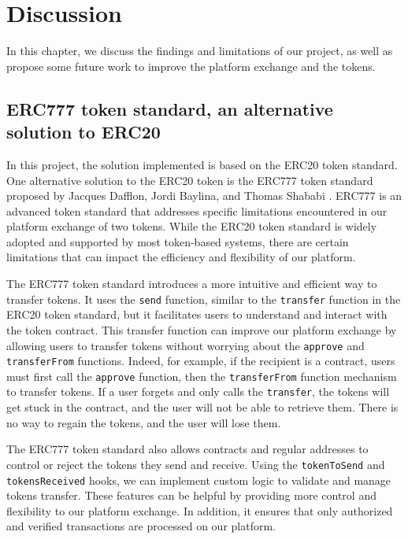 \chapter{Discussion}
\label{ch:futurework}


In this chapter, we discuss the findings and limitations of our project, as well as propose some future work to improve
the platform exchange and the tokens.


\section{ERC777 token standard, an alternative solution to ERC20}


In this project, the solution implemented is based on the ERC20 token standard. One alternative solution to the ERC20 token
is the ERC777 token standard proposed by Jacques Dafflon, Jordi Baylina, and Thomas Shababi \cite{erc777}. ERC777 is an advanced
token standard that addresses specific limitations encountered in our platform exchange of two tokens. While the ERC20
token standard is widely adopted and supported by most token-based systems, there are certain limitations that can
impact the efficiency and flexibility of our platform.


The ERC777 token standard introduces a more intuitive and efficient way to transfer tokens. It uses the
\texttt{send} function, similar to the \texttt{transfer} function in the ERC20 token standard, but it facilitates
users to understand and interact with the token contract. This transfer function can improve our platform exchange by
allowing users to transfer tokens without worrying about the \texttt{approve} and \texttt{transferFrom} functions.
Indeed, for example, if the recipient is a contract, users must first call the \texttt{approve} function, then the
\texttt{transferFrom} function mechanism to transfer tokens. If a user forgets and only calls the \texttt{transfer}, the
tokens will get stuck in the contract, and the user will not be able to retrieve them. There is no way to regain the tokens, and the user will lose them.


The ERC777 token standard also allows contracts and regular addresses to control or reject the tokens they
send and receive. Using the \texttt{tokenToSend} and \texttt{tokensReceived} hooks, we can implement custom logic
to validate and manage tokens transfer. These features can be helpful by providing more control and flexibility
to our platform exchange. In addition, it ensures that only authorized and verified transactions are processed on our platform.


